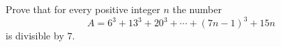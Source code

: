 Prove that for every positive integer $n$ the number
\[A=6^3+13^3+20^3+\cdots+(7n-1)^3+15n\]
is divisible by $7$.
